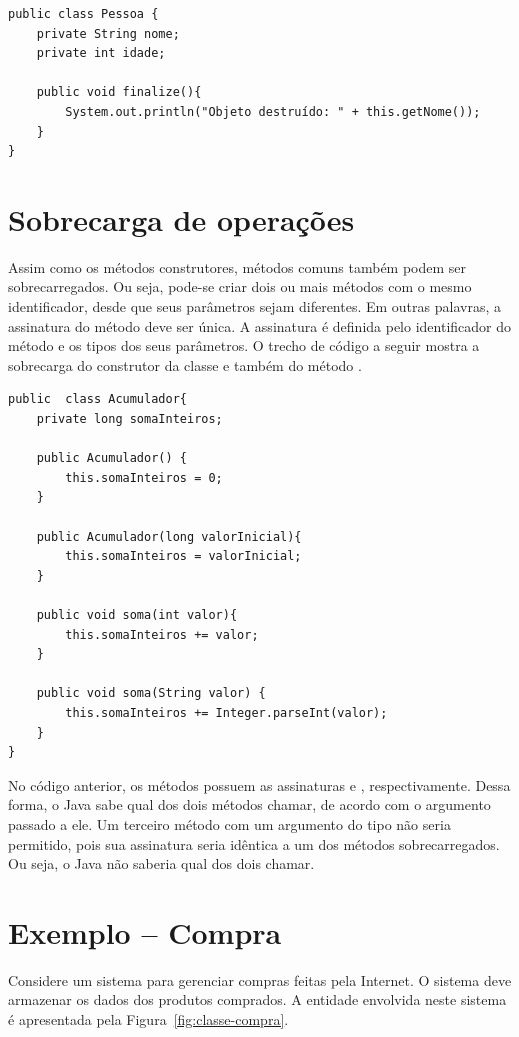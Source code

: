 \begin{verbatim}
public class Pessoa {	  	
	private String nome;	  	
	private int idade;  	
	
	public void finalize(){	  	
		System.out.println("Objeto destruído: " + this.getNome());	
	}	
} 
\end{verbatim}

\section{Sobrecarga de operações}
\label{sec:sobrecarga}

Assim como os métodos construtores, métodos comuns também podem ser sobrecarregados. Ou seja, pode-se criar dois ou mais métodos com o mesmo identificador, desde que seus parâmetros sejam diferentes. Em outras palavras, a assinatura do método deve ser única. A assinatura é definida pelo identificador do método e os tipos dos seus parâmetros. O trecho de código a seguir mostra a sobrecarga do construtor da classe e também do método .
 
\begin{verbatim}
public	class Acumulador{	
	private long somaInteiros;	
	
	public Acumulador() {		
		this.somaInteiros = 0;		
	}	
	
	public Acumulador(long valorInicial){		
		this.somaInteiros = valorInicial;	
	}	
	
	public void soma(int valor){	
		this.somaInteiros += valor;	
	}	
	
	public void soma(String valor) {		
		this.somaInteiros += Integer.parseInt(valor);	
	}	
} 
\end{verbatim}

No código anterior, os métodos  possuem as assinaturas  e , respectivamente. Dessa forma, o Java sabe qual dos dois métodos chamar, de acordo com o argumento passado a ele. Um terceiro método com um argumento do tipo  não seria permitido, pois sua assinatura seria idêntica a um dos métodos sobrecarregados. Ou seja, o Java não saberia qual dos dois chamar.

\section{Exemplo -- Compra}

Considere um sistema para gerenciar compras feitas pela Internet. O sistema deve armazenar os dados dos produtos comprados. A entidade envolvida neste sistema é apresentada pela Figura~\ref{fig:classe-compra}.

